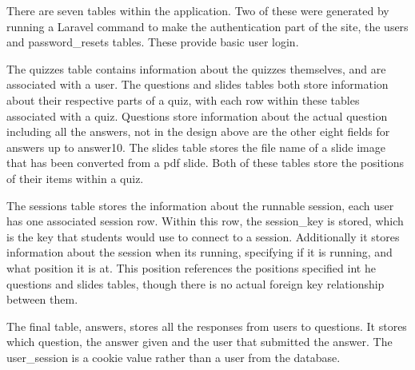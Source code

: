 There are seven tables within the application. Two of these were generated by running a Laravel command to make the authentication part of the site, the users and password\_resets tables. These provide basic user login.

The quizzes table contains information about the quizzes themselves, and are associated with a user. The questions and slides tables both store information about their respective parts of a quiz, with each row within these tables associated with a quiz. Questions store information about the actual question including all the answers, not in the design above are the other eight fields for answers up to answer10. The slides table stores the file name of a slide image that has been converted from a pdf slide. Both of these tables store the positions of their items within a quiz.

The sessions table stores the information about the runnable session, each user has one associated session row. Within this row, the session\_key is stored, which is the key that students would use to connect to a session. Additionally it stores information about the session when its running, specifying if it is running, and what position it is at. This position references the positions specified int he questions and slides tables, though there is no actual foreign key relationship between them. 

The final table, answers, stores all the responses from users to questions. It stores which question, the answer given and the user that submitted the answer. The user\_session is a cookie value rather than a user from the database.
